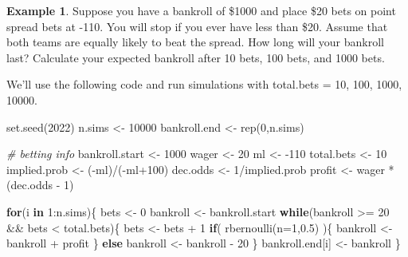 \documentclass[
  11pt,
]{book}
\newenvironment{Shaded}{\begin{snugshade}}{\end{snugshade}}
\newcommand{\AttributeTok}[1]{\textcolor[rgb]{0.77,0.63,0.00}{#1}}
\newcommand{\CommentTok}[1]{\textcolor[rgb]{0.56,0.35,0.01}{\textit{#1}}}
\newcommand{\ControlFlowTok}[1]{\textcolor[rgb]{0.13,0.29,0.53}{\textbf{#1}}}
\newcommand{\DecValTok}[1]{\textcolor[rgb]{0.00,0.00,0.81}{#1}}
\newcommand{\FloatTok}[1]{\textcolor[rgb]{0.00,0.00,0.81}{#1}}
\newcommand{\FunctionTok}[1]{\textcolor[rgb]{0.00,0.00,0.00}{#1}}
\newcommand{\NormalTok}[1]{#1}
\newcommand{\OtherTok}[1]{\textcolor[rgb]{0.56,0.35,0.01}{#1}}
\newcommand{\SpecialCharTok}[1]{\textcolor[rgb]{0.00,0.00,0.00}{#1}}
\theoremstyle{definition}
\theoremstyle{definition}
\newtheorem{example}{Example}[chapter]
\theoremstyle{definition}
\theoremstyle{definition}
\theoremstyle{remark}
\begin{document}
\begin{example}
Suppose you have a bankroll of \$1000 and place \$20 bets on point spread bets at -110. You will stop if you ever have less than \$20. Assume that both teams are equally likely to beat the spread. How long will your bankroll last? Calculate your expected bankroll after 10 bets, 100 bets, and 1000 bets.
\end{example}

We'll use the following code and run simulations with total.bets = 10, 100, 1000, 10000.

\begin{Shaded}
\begin{Highlighting}[]
\FunctionTok{set.seed}\NormalTok{(}\DecValTok{2022}\NormalTok{)}
\NormalTok{n.sims }\OtherTok{\textless{}{-}} \DecValTok{10000}
\NormalTok{bankroll.end }\OtherTok{\textless{}{-}} \FunctionTok{rep}\NormalTok{(}\DecValTok{0}\NormalTok{,n.sims)}

\CommentTok{\# betting info}
\NormalTok{bankroll.start }\OtherTok{\textless{}{-}} \DecValTok{1000}
\NormalTok{wager }\OtherTok{\textless{}{-}} \DecValTok{20}
\NormalTok{ml }\OtherTok{\textless{}{-}} \SpecialCharTok{{-}}\DecValTok{110}
\NormalTok{total.bets }\OtherTok{\textless{}{-}} \DecValTok{10}
\NormalTok{implied.prob }\OtherTok{\textless{}{-}}\NormalTok{ (}\SpecialCharTok{{-}}\NormalTok{ml)}\SpecialCharTok{/}\NormalTok{(}\SpecialCharTok{{-}}\NormalTok{ml}\SpecialCharTok{+}\DecValTok{100}\NormalTok{)}
\NormalTok{dec.odds }\OtherTok{\textless{}{-}} \DecValTok{1}\SpecialCharTok{/}\NormalTok{implied.prob}
\NormalTok{profit }\OtherTok{\textless{}{-}}\NormalTok{ wager }\SpecialCharTok{*}\NormalTok{ (dec.odds }\SpecialCharTok{{-}} \DecValTok{1}\NormalTok{)}

\ControlFlowTok{for}\NormalTok{(i }\ControlFlowTok{in} \DecValTok{1}\SpecialCharTok{:}\NormalTok{n.sims)\{}
\NormalTok{  bets }\OtherTok{\textless{}{-}} \DecValTok{0}
\NormalTok{  bankroll }\OtherTok{\textless{}{-}}\NormalTok{ bankroll.start}
  \ControlFlowTok{while}\NormalTok{(bankroll }\SpecialCharTok{\textgreater{}=} \DecValTok{20} \SpecialCharTok{\&\&}\NormalTok{ bets }\SpecialCharTok{\textless{}}\NormalTok{ total.bets)\{}
\NormalTok{    bets }\OtherTok{\textless{}{-}}\NormalTok{ bets }\SpecialCharTok{+} \DecValTok{1}
    \ControlFlowTok{if}\NormalTok{( }\FunctionTok{rbernoulli}\NormalTok{(}\AttributeTok{n=}\DecValTok{1}\NormalTok{,}\FloatTok{0.5}\NormalTok{) )\{}
\NormalTok{      bankroll }\OtherTok{\textless{}{-}}\NormalTok{ bankroll }\SpecialCharTok{+}\NormalTok{ profit}
\NormalTok{    \} }\ControlFlowTok{else}
\NormalTok{      bankroll }\OtherTok{\textless{}{-}}\NormalTok{ bankroll }\SpecialCharTok{{-}} \DecValTok{20}
\NormalTok{  \}}
\NormalTok{  bankroll.end[i] }\OtherTok{\textless{}{-}}\NormalTok{ bankroll}
\NormalTok{\}}


\end{Highlighting}
\end{Shaded}
\end{document}
